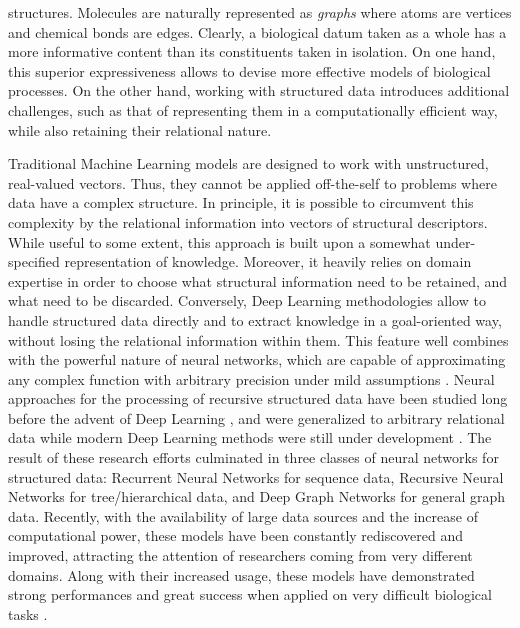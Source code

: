 structures. Molecules are naturally represented as \emph{graphs} where atoms are vertices and chemical bonds are edges. Clearly, a biological datum taken as a whole has a more informative content than its constituents taken in isolation. On one hand, this superior expressiveness allows to devise more effective models of biological processes. On the other hand, working with structured data introduces additional challenges, such as that of representing them in a computationally efficient way, while also retaining their relational nature.

Traditional Machine Learning models are designed to work with unstructured, real-valued vectors. Thus, they cannot be applied off-the-self to problems where data have a complex structure. In principle, it is possible to circumvent this complexity by  the relational information into vectors of structural descriptors. While useful to some extent, this approach is built upon a somewhat under-specified representation of knowledge. Moreover, it heavily relies on domain expertise in order to choose what structural information need to be retained, and what need to be discarded. Conversely, Deep Learning methodologies allow to handle structured data directly and to extract knowledge in a goal-oriented way, without losing the relational information within them. This feature well combines with the powerful nature of neural networks, which are capable of approximating any complex function with arbitrary precision under mild assumptions \citep{cybenko1998approximationuniversal,hammer2005universal}. Neural approaches for the processing of recursive structured data have been studied long before the advent of Deep Learning \cite{elman1990rnn,sperduti1997generalizedneuron,frasconi1998general}, and were generalized to arbitrary relational data while modern Deep Learning methods were still under development \citep{micheli2009nn4g,scarselli2009gnn}. The result of these research efforts culminated in three classes of neural networks for structured data: Recurrent Neural Networks for sequence data, Recursive Neural Networks for tree/hierarchical data, and Deep Graph Networks for general graph data. Recently, with the availability of large data sources and the increase of computational power, these models have been constantly rediscovered and improved, attracting the attention of researchers coming from very different domains. Along with their increased usage, these models have demonstrated strong performances and great success when applied on very difficult biological tasks \cite{bianucci2000applicationcascorstructurechemistry,baldi2013recursiveneuralnets,duvenaud2015molecularfingerprint,bradshaw2019moleculechef}.


